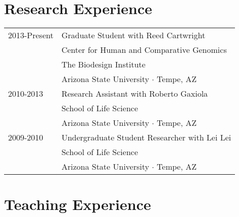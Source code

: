 \documentclass[11pt]{article}
\begin{document}
\section*{Research Experience}
\begin{tabularx}{\linewidth}{lX}
2013-Present&Graduate Student with Reed Cartwright\\
&Center for Human and Comparative Genomics\\
&The Biodesign Institute\\
&Arizona State University $\cdotp$ Tempe, AZ\\
2010-2013&Research Assistant with Roberto Gaxiola\\
&School of Life Science\\
&Arizona State University $\cdotp$ Tempe, AZ\\
2009-2010&Undergraduate Student Researcher with Lei Lei\\
&School of Life Science\\
&Arizona State University $\cdotp$ Tempe, AZ\\
\end{tabularx}


\section*{Teaching Experience}
\end{document}
